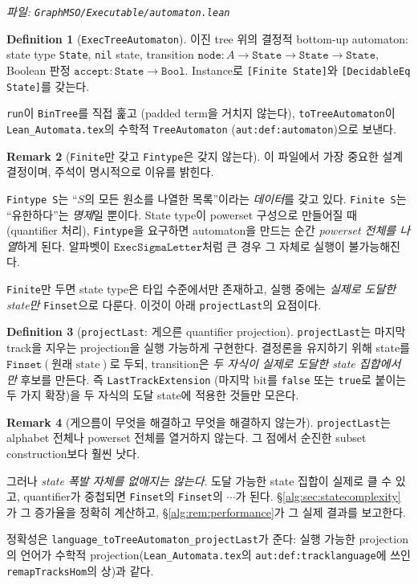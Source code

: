 \documentclass[11pt]{article}
\theoremstyle{definition}
\newtheorem{definition}{Definition}[section]
\newtheorem{remark}[definition]{Remark}
\theoremstyle{plain}
\newcommand{\lean}[1]{\texttt{#1}}
\newcommand{\leanfile}[1]{\texttt{#1}}
\begin{document}
\emph{파일: \leanfile{GraphMSO/Executable/automaton.lean}}

\begin{definition}[\lean{ExecTreeAutomaton}]
\label{alg:def:execautomaton}
이진 tree 위의 결정적 bottom-up automaton:
state type \lean{State}, \lean{nil} state, transition
$\lean{node} : A \to \lean{State} \to \lean{State} \to \lean{State}$,
Boolean 판정 $\lean{accept} : \lean{State} \to \lean{Bool}$.
Instance로 \lean{[Finite State]}와 \lean{[DecidableEq State]}를 갖는다.

\lean{run}이 \lean{BinTree}를 직접 훑고 (padded term을 거치지 않는다),
\lean{toTreeAutomaton}이 \leanfile{Lean\_Automata.tex}의 수학적
\lean{TreeAutomaton} (\lean{aut:def:automaton})으로 보낸다.
\end{definition}

\begin{remark}[\lean{Finite}만 갖고 \lean{Fintype}은 갖지 않는다]
\label{alg:rem:finitenotfintype}
이 파일에서 가장 중요한 설계 결정이며, 주석이 명시적으로 이유를 밝힌다.

\lean{Fintype S}는 ``$S$의 모든 원소를 나열한 목록''이라는 \emph{데이터}를
갖고 있다. \lean{Finite S}는 ``유한하다''는 \emph{명제}일 뿐이다. State type이
powerset 구성으로 만들어질 때 (quantifier 처리), \lean{Fintype}을 요구하면
automaton을 만드는 순간 \emph{powerset 전체를 나열}하게 된다. 알파벳이
$\lean{ExecSigmaLetter}$처럼 큰 경우 그 자체로 실행이 불가능해진다.

\lean{Finite}만 두면 state type은 타입 수준에서만 존재하고, 실행 중에는
\emph{실제로 도달한 state만} \lean{Finset}으로 다룬다. 이것이 아래
\lean{projectLast}의 요점이다.
\end{remark}

\begin{definition}[\lean{projectLast}: 게으른 quantifier projection]
\label{alg:def:projectlast}
\lean{projectLast}는 마지막 track을 지우는 projection을 실행 가능하게 구현한다.
결정론을 유지하기 위해 state를 $\lean{Finset}(\text{원래 state})$로 두되,
transition은 \emph{두 자식이 실제로 도달한 state 집합에서만} 후보를 만든다.
즉 \lean{LastTrackExtension} (마지막 bit를 \lean{false} 또는 \lean{true}로
붙이는 두 가지 확장)을 두 자식의 도달 state에 적용한 것들만 모은다.
\end{definition}

\begin{remark}[게으름이 무엇을 해결하고 무엇을 해결하지 않는가]
\label{alg:rem:lazydoesnotsolve}
\lean{projectLast}는 alphabet 전체나 powerset 전체를 열거하지 않는다. 그
점에서 순진한 subset construction보다 훨씬 낫다.

그러나 \emph{state 폭발 자체를 없애지는 않는다}. 도달 가능한 state 집합이
실제로 클 수 있고, quantifier가 중첩되면 \lean{Finset}의 \lean{Finset}의
$\cdots$가 된다. \S\ref{alg:sec:statecomplexity}가 그 증가율을 정확히
계산하고, \S\ref{alg:rem:performance}가 그 실제 결과를 보고한다.

정확성은 \lean{language\_toTreeAutomaton\_projectLast}가 준다: 실행 가능한
projection의 언어가 수학적 projection(\leanfile{Lean\_Automata.tex}의
\lean{aut:def:tracklanguage}에 쓰인 \lean{remapTracksHom}의 상)과 같다.
\end{remark}
\end{document}
